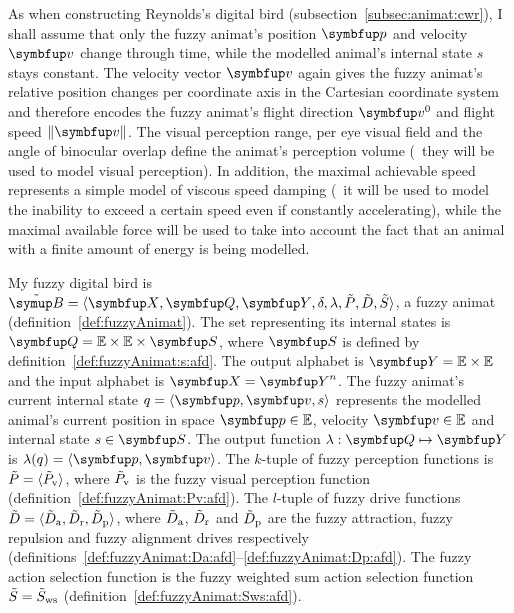 As when constructing Reynolds's digital bird (subsection~\ref{subsec:animat:cwr}), I shall assume that only the fuzzy animat's position $\vect{p}$ and velocity $\vect{v}$ change through time, while the modelled animal's internal state $s$ stays constant. The velocity vector $\vect{v}$ again gives the fuzzy animat's relative position changes per coordinate axis in the Cartesian coordinate system and therefore encodes the fuzzy animat's flight direction $\vect{v}^0$ and flight speed $\left\|\vect{v}\right\|$. The visual perception range, per eye visual field and the angle of binocular overlap define the animat's perception volume (\ie\ they will be used to model visual perception). In addition, the maximal achievable speed represents a simple model of viscous speed damping (\ie\ it will be used to model the inability to exceed a certain speed even if constantly accelerating), while the maximal available force will be used to take into account the fact that an animal with a finite amount of energy is being modelled.

\begin{definition}
	\label{def:fuzzyAnimat:afd}
	My fuzzy digital bird is $\fautom{B}=\langle\set{X},\set{Q},\set{Y},\delta,\lambda,\ffunc{P},\ffunc{D},\ffunc{S}\rangle$, a fuzzy animat (definition~\ref{def:fuzzyAnimat}). The set representing its internal states is $\set{Q}=\E \times \E \times \set{S}$, where $\set{S}$ is defined by definition~\ref{def:fuzzyAnimat:s:afd}. The output alphabet is $\set{Y}=\E \times \E$ and the input alphabet is $\set{X}=\set{Y}^n$. The fuzzy animat's current internal state $q=\langle\vect{p},\vect{v},s\rangle$ represents the modelled animal's current position in space $\vect{p} \in \E$, velocity $\vect{v} \in \E$ and internal state $s \in \set{S}$. The output function $\lambda: \set{Q} \mapsto \set{Y}$ is $\lambda(q)=\langle\vect{p},\vect{v}\rangle$. The $k$-tuple of fuzzy perception functions is $\tilde{P}=\langle\tilde{P}_\textnormal{v}\rangle$, where $\tilde{P}_\textnormal{v}$ is the fuzzy visual perception function (definition~\ref{def:fuzzyAnimat:Pv:afd}). The $l$-tuple of fuzzy drive functions $\tilde{D}=\langle\tilde{D}_\textnormal{a},\tilde{D}_\textnormal{r},\tilde{D}_\textnormal{p}\rangle$, where $\tilde{D}_\textnormal{a}$, $\tilde{D}_\textnormal{r}$ and $\tilde{D}_\textnormal{p}$ are the fuzzy attraction, fuzzy repulsion and fuzzy alignment drives respectively  (definitions~\ref{def:fuzzyAnimat:Da:afd}--\ref{def:fuzzyAnimat:Dp:afd}). The fuzzy action selection function is the fuzzy weighted sum action selection function $\tilde{S}=\tilde{S}_\textnormal{ws}$ (definition~\ref{def:fuzzyAnimat:Sws:afd}).
\end{definition}


